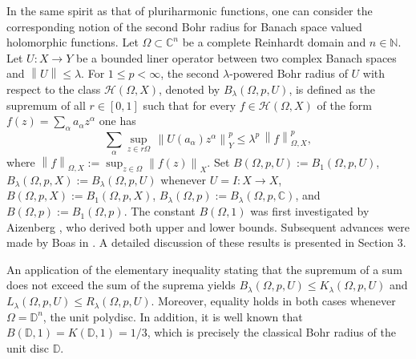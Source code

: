 \documentclass[a4paper,11pt, reqno]{amsart}
\theoremstyle{definition}
\newcounter {own}
\newcommand{\norm}[1]{\left\lVert#1\right\rVert}
\begin{document}
	In the same spirit as that of pluriharmonic functions, one can consider the corresponding notion of the second Bohr radius for Banach space valued holomorphic functions. Let $\Omega\subset \mathbb{C}^n$ be a complete Reinhardt domain and $n\in \mathbb{N}$. Let $U:X\rightarrow Y$ be a bounded liner operator between two complex Banach spaces and $\norm{U} \leq \lambda$. For $1 \leq p < \infty$, the second $\lambda$-powered Bohr radius of $U$ with respect to the class $\mathcal{H}(\Omega,X)$, denoted by $B_{\lambda}(\Omega, p,U)$, is defined as the supremum of all $r \in [0,1]$ such that for every $f \in \mathcal{H}(\Omega,X)$ of the form $f(z)=\sum_{\alpha}a_{\alpha}z^{\alpha}$ one has 
	\begin{equation} \label{e-1.2-a}
		 \sum_{\alpha} \sup_{z \in r\Omega}\, \norm{U(a_{\alpha})z^\alpha}^p_{Y} \leq \lambda^p\,\norm{f}^p_{\Omega,X}, 
	\end{equation}
	where $\norm{f}_{\Omega,X}:=\sup_{z \in \Omega}\norm{f(z)}_{X}$. Set $B(\Omega, p,U):=B_{1}(\Omega, p,U)$, $B_{\lambda}(\Omega, p,X):=B_{\lambda}(\Omega, p,U)$ whenever $U=I:X\rightarrow X$, $B(\Omega, p,X):=B_{1}(\Omega, p,X)$, $B_{\lambda}(\Omega, p):=B_{\lambda}(\Omega, p,\mathbb{C})$, and $B(\Omega,p):=B_1(\Omega,p)$. The constant $B(\Omega,1)$ was first investigated by Aizenberg \cite{aizn-2000a}, who derived both upper and lower bounds. Subsequent advances were made by Boas in \cite{boas-2000}. A detailed discussion of these results is presented in Section $3$.
	\vspace{1mm}
	
	An application of the elementary inequality stating that the supremum of a sum does not exceed the sum of the suprema yields $B_{\lambda}(\Omega, p,U) \leq K_{\lambda}(\Omega, p,U)$ and $L_{\lambda}(\Omega, p,U) \leq R_{\lambda}(\Omega, p,U)$. Moreover, equality holds in both cases whenever $\Omega=\mathbb{D}^n$, the unit polydisc. In addition, it is well known that $B(\mathbb{D},1)=K(\mathbb{D},1)=1/3$, which is precisely the classical Bohr radius of the unit disc $\mathbb{D}$.
	\vspace{1mm}
	
\end{document}
